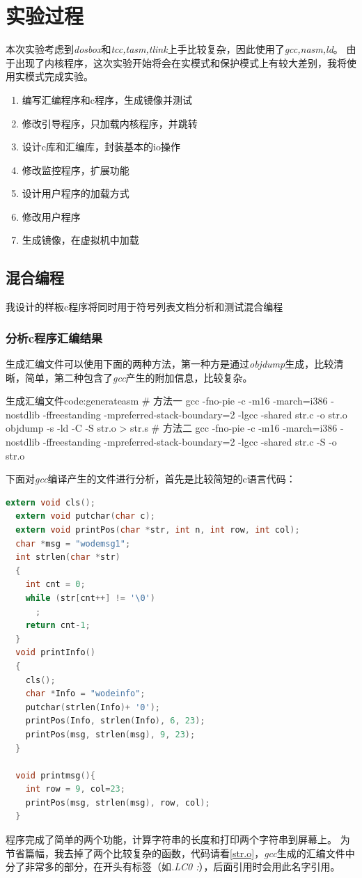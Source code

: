 \documentclass[a4paper, 11pt]{article} %
\newcounter{code}
\begin{document}
\section{实验过程}

本次实验考虑到\textit{dosbox}和\textit{tcc,tasm,tlink}上手比较复杂，因此使用了\textit{gcc,nasm,ld}。
由于出现了内核程序，这次实验开始将会在实模式和保护模式上有较大差别，我将使用实模式完成实验。
\begin{enumerate}
  \item 编写汇编程序和c程序，生成镜像并测试
  \item 修改引导程序，只加载内核程序，并跳转
  \item 设计c库和汇编库，封装基本的io操作
  \item 修改监控程序，扩展功能
  \item 设计用户程序的加载方式
  \item 修改用户程序
  \item 生成镜像，在虚拟机中加载
\end{enumerate}
\subsection{混合编程}

我设计的样板c程序将同时用于符号列表文档分析和测试混合编程
\subsubsection{分析c程序汇编结果}

生成汇编文件可以使用下面的两种方法，第一种方是通过\textit{objdump}生成，比较清晰，简单，第二种包含了\textit{gcc}产生的附加信息，比较复杂。
\begin{code}{生成汇编文件}{code:generateasm}
# 方法一
gcc -fno-pie -c -m16 -march=i386 -nostdlib -ffreestanding 
-mpreferred-stack-boundary=2 -lgcc -shared str.c -o str.o
objdump  -s -ld -C -S str.o > str.s
# 方法二
gcc -fno-pie -c -m16 -march=i386 -nostdlib -ffreestanding 
-mpreferred-stack-boundary=2 -lgcc -shared str.c -S -o str.o
\end{code}
下面对\textit{gcc}编译产生的文件进行分析，首先是比较简短的c语言代码：
\begin{lstlisting}[language={c},label=str_c,caption=str.c]
  extern void cls();
  extern void putchar(char c);
  extern void printPos(char *str, int n, int row, int col);
  char *msg = "wodemsg1";
  int strlen(char *str)
  {
    int cnt = 0;
    while (str[cnt++] != '\0')
      ;
    return cnt-1;
  }
  void printInfo()
  {
    cls();
    char *Info = "wodeinfo";
    putchar(strlen(Info)+ '0');
    printPos(Info, strlen(Info), 6, 23);
    printPos(msg, strlen(msg), 9, 23);
  }
  
  void printmsg(){
    int row = 9, col=23;
    printPos(msg, strlen(msg), row, col);
  }
  \end{lstlisting}
程序完成了简单的两个功能，计算字符串的长度和打印两个字符串到屏幕上。
为节省篇幅，我去掉了两个比较复杂的函数，代码请看\ref{str.o}，\textit{gcc}生成的汇编文件中分了非常多的部分，在开头有标签（如\textit{.LC0 :}），后面引用时会用此名字引用。
\end{document}
